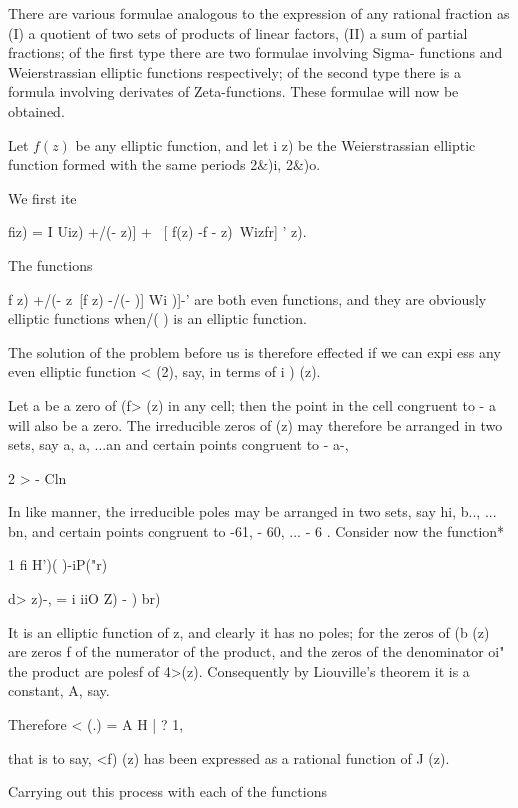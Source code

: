 {There are various formulae analogous to the expression of any rational
fraction as (I) a quotient of two sets of products of linear factors,
(II) a sum of partial fractions; of the first type there are two
formulae involving Sigma- functions and Weierstrassian elliptic
functions respectively; of the second type there is a formula
involving derivates of Zeta-functions. These formulae will now be
obtained.


Let $f(z)$ be any elliptic function, and let i z) be the Weierstrassian
elliptic function formed with the same periods 2\&)i, 2\&)o.

We first ite

fiz) = I Uiz) +/(- z)] + \ [ f(z) -f - z)\ Wizfr] ' z).

%
%

The functions

f z) +/(- z\ [f z) -/(- )] Wi )]-' are both even functions, and they
are obviously elliptic functions when/( ) is an elliptic function.

The solution of the problem before us is therefore effected if we can
expi ess any even elliptic function < (2), say, in terms of i ) (z).

Let a be a zero of (f> (z) in any cell; then the point in the cell
congruent to - a will also be a zero. The irreducible zeros of (z) may
therefore be arranged in two sets, say a, a, ...an and certain
points congruent to - a-,

 2 >    - Cln

In like manner, the irreducible poles may be arranged in two sets, say
hi, b.., ... bn, and certain points congruent to -61, - 60, ... - 6 .
Consider now the function*

1 fi H')( )-iP("r)

d> z)-, = i iiO Z) - ) br)

It is an elliptic function of z, and clearly it has no poles; for the
zeros of (b (z) are zeros f of the numerator of the product, and the
zeros of the denominator oi" the product are polesf of 4>(z).
Consequently by Liouville's theorem it is a constant, A, say.

Therefore < (.) = A H | ? 1,

that is to say, <f) (z) has been expressed as a rational function of J
(z).

Carrying out this process with each of the functions

}
